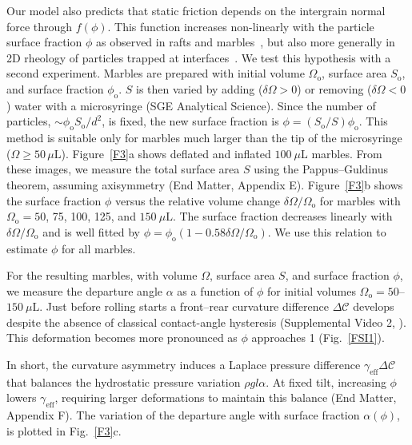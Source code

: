 \documentclass[twocolumn, prl,
 amsmath,amssymb,
 superscriptaddress,aps,
]{revtex4-2}
\begin{document}
Our model also predicts that static friction depends on the intergrain normal force through $f(\phi)$.
This function increases non-linearly with the particle surface fraction $\phi$ as observed in rafts and marbles~\cite{cicuta2009granular,varshney2012amorphous,lagubeau2014armoring}, but also more generally in 2D rheology of particles trapped at interfaces~\cite{cicuta2003shearing, madivala2009self,kato2023surface}.
We test this hypothesis with a second experiment. Marbles are prepared with initial volume $\Omega_\mathrm{o}$, surface area $S_\mathrm{o}$, and surface fraction $\phi_\mathrm{o}$. $S$ is then varied by adding ($\delta\Omega>0$) or removing ($\delta\Omega<0$) water with a microsyringe (SGE Analytical Science). Since the number of particles, $\sim\phi_\mathrm{o}S_\mathrm{o}/d^2$, is fixed, the new surface fraction is $\phi=(S_\mathrm{o}/S)\phi_\mathrm{o}$.
This method is suitable only for marbles much larger than the tip of the microsyringe ($\Omega\geq50\,\mu\mathrm{L}$).
Figure~\ref{F3}a shows deflated and inflated $100~\mu\mathrm{L}$ marbles. From these images, we measure the total surface area $S$ using the Pappus--Guldinus theorem, assuming axisymmetry (End Matter, Appendix E). Figure~\ref{F3}b shows the surface fraction $\phi$ versus the relative volume change $\delta\Omega/\Omega_\mathrm{o}$ for marbles with $\Omega_\mathrm{o}=50$, 75, 100, 125, and $150~\mu\mathrm{L}$. The surface fraction decreases linearly with $\delta\Omega/\Omega_\mathrm{o}$ and is well fitted by $\phi=\phi_\mathrm{o}(1-0.58\delta\Omega/\Omega_\mathrm{o})$. We use this relation to estimate $\phi$ for all marbles.

For the resulting marbles, with volume $\Omega$, surface area $S$, and surface fraction $\phi$, we measure the departure angle $\alpha$ as a function of $\phi$ for initial volumes $\Omega_\mathrm{o}=50$--$150~\mu\mathrm{L}$.
Just before rolling starts a front--rear curvature difference $\Delta\mathcal{C}$ develops despite the absence of classical contact-angle hysteresis (Supplemental Video 2, \cite{Supplemental}). This deformation becomes more pronounced as $\phi$ approaches 1 (Fig.~\ref{FSI1}).

In short, the curvature asymmetry induces a Laplace pressure difference $\gamma_\mathrm{eff}\Delta\mathcal{C}$ that balances the hydrostatic pressure variation $\rho g l\alpha$. At fixed tilt, increasing $\phi$ lowers $\gamma_\mathrm{eff}$, requiring larger deformations to maintain this balance (End Matter, Appendix F).
The variation of the departure angle with surface fraction $\alpha(\phi)$, is plotted in Fig.~\ref{F3}c.
\end{document}
